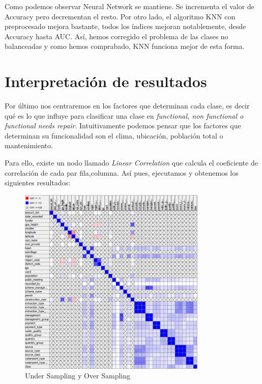 	Como podemos observar Neural Network se mantiene. Se incrementa el valor de Accuracy pero decrementan el resto. 
	Por otro lado, el algoritmo KNN con preprocesado mejora bastante, todos los índices mejoran notablemente, desde Accuracy hasta AUC. Así, hemos corregido el problema de las clases no balanceadas y como hemos comprabado, KNN funciona mejor de esta forma.
	
	
		
	\section{Interpretación de resultados}
	
	\hspace{1cm} Por último nos centraremos en los factores que determinan cada clase, es decir qué es lo que influye para clasificar una clase en \textit{functional, non functional o functional needs repair}. Intuitivamente podemos pensar que los factores que determinan su funcionalidad son el clima, ubicación, población total o mantenimiento.
	
	
	
	
	

	
	Para ello, existe un nodo llamado \textit{Linear Correlation} que calcula el coeficiente de correlación de cada par {fila,columna}.
	Así pues, ejecutamos y obtenemos los siguientes resultados:
	
	\begin{figure}[H]
		\centering
		\includegraphics[width=0.8\textwidth]{img/correlation.png}
		\caption{Under Sampling y Over Sampling}
	\end{figure}
	
